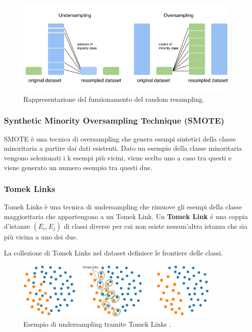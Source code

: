 \begin{figure}[ht]
  \centering
  \includegraphics[width=\textwidth]{images/resampling.png}
  \caption{Rappresentazione del funzionamento del random resampling.}
\end{figure}

\subsubsection*{Synthetic Minority Oversampling Technique (SMOTE)}
SMOTE è una tecnica di oversampling che genera esempi sintetici della classe minoritaria a partire dai dati esistenti.
Dato un esempio della classe minoritaria vengono selezionati i k esempi più vicini, viene scelto uno a caso tra questi e
viene generato un numero esempio tra questi due.

\subsubsection*{Tomek Links}
Tomek Links è una tecnica di undersampling che rimuove gli esempi della classe maggioritaria che appartengono a un Tomek Link.
Un \textbf{Tomek Link} é una coppia d'istanze $(E_i, E_j)$ di classi diverse per cui non esiste nessun'altra istanza che sia più vicina 
a uno dei due.

La collezione di Tomek Links nel dataset definisce le frontiere delle classi.
\begin{figure}[ht]
  \centering
  \includegraphics[width=0.9\textwidth]{images/tomeklinks.png}
  \caption{Esempio di undersampling tramite Tomek Links \cite{web:TomekLinks}.}
\end{figure}

